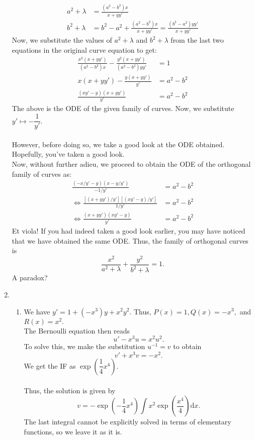 \documentclass[12pt]{article}
\theoremstyle{definition}
\numberwithin{thm}{section}
\begin{document}
\begin{enumerate}[leftmargin=*, label = Q.\arabic*.]
\begin{align*}
		a^2 + \lambda & = \frac{(a^2 - b^2)x}{x + yy'}\\
		b^2 + \lambda & = b^2 - a^2 + \frac{(a^2 - b^2)x}{x + yy'} = \frac{(b^2 - a^2)yy'}{x + yy'}
	\end{align*}
	Now, we substitute the values of $a^2 + \lambda$ and $b^2 + \lambda$ from the last two equations in the original curve equation to get:
	\begin{align*} 
		\frac{x^2(x + yy')}{(a^2 - b^2)x} - \frac{y^2(x + yy')}{(a^2 - b^2)yy'} &= 1\\
		x(x + yy') - \frac{y(x + yy')}{y'} &= a^2 - b^2\\
		\frac{(xy' - y)(x + yy')}{y'} &= a^2 - b^2
	\end{align*}
	The above is the ODE of the given family of curves. Now, we substitute $y' \mapsto -\dfrac{1}{y'}.$\\~\\
	However, before doing so, we take a good look at the ODE obtained.\\
	Hopefully, you've taken a good look.\\
	Now, without further adieu, we proceed to obtain the ODE of the orthogonal family of curves as:
	\begin{align*} 
		\frac{(-x/y' - y)(x - y/y')}{-1/y'} &= a^2 - b^2\\
		\iff \frac{[(x + yy')/y'][(xy' - y)/y']}{1/y'} &= a^2 - b^2\\
		\iff \frac{(x + yy')(xy' - y)}{y'} &= a^2 - b^2
	\end{align*}
	Et viola! If you had indeed taken a good look earlier, you may have noticed that we have obtained the same ODE. Thus, the family of orthogonal curves is
	\[\frac{x^2}{a^2 + \lambda} + \frac{y^2}{b^2 + \lambda} = 1.\]
	A paradox?
	\item \begin{enumerate}[label = (\roman*)] 
		\item We have $y' = 1 + (-x^3)y + x^2y^2.$ Thus, $P(x) = 1, Q(x) = -x^3,$ and $R(x) = x^2.$\\
		The Bernoulli equation then reads
		\[u' - x^3u = x^2u^2.\]
		To solve this, we make the substitution $u^{-1} = v$ to obtain
		\[v' + x^3v = -x^2.\]
		We get the IF as $\exp\left(\dfrac{1}{4}x^4\right).$\\~\\
		Thus, the solution is given by
		\[v = -\exp\left(-\dfrac{1}{4}x^4\right)\int x^2\exp\left(\dfrac{x^4}{4}\right) \text{d}x.\]
		The last integral cannot be explicitly solved in terms of elementary functions, so we leave it as it is.\\

\end{enumerate}
\end{enumerate}
\end{document}
